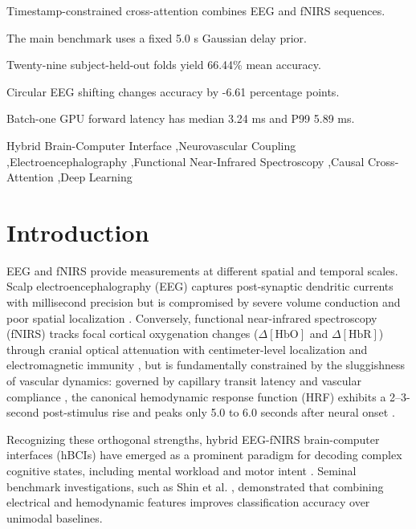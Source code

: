\documentclass[final,5p,times,twocolumn]{elsarticle}
\begin{document}
\begin{frontmatter}
\begin{highlights}
\item Timestamp-constrained cross-attention combines EEG and fNIRS sequences.
\item The main benchmark uses a fixed 5.0 s Gaussian delay prior.
\item Twenty-nine subject-held-out folds yield 66.44\% mean accuracy.
\item Circular EEG shifting changes accuracy by -6.61 percentage points.
\item Batch-one GPU forward latency has median 3.24 ms and P99 5.89 ms.
\end{highlights}

\begin{keyword}
Hybrid Brain-Computer Interface \sep Neurovascular Coupling \sep Electroencephalography \sep Functional Near-Infrared Spectroscopy \sep Causal Cross-Attention \sep Deep Learning
\end{keyword}

\end{frontmatter}

\section{Introduction}
\label{sec:intro}
EEG and fNIRS provide measurements at different spatial and temporal scales. Scalp electroencephalography (EEG) captures post-synaptic dendritic currents with millisecond precision but is compromised by severe volume conduction and poor spatial localization \cite{buzsaki2012origin}. Conversely, functional near-infrared spectroscopy (fNIRS) tracks focal cortical oxygenation changes ($\Delta[\text{HbO}]$ and $\Delta[\text{HbR}]$) through cranial optical attenuation with centimeter-level localization and electromagnetic immunity \cite{delpy1988estimation, scholkmann2014review}, but is fundamentally constrained by the sluggishness of vascular dynamics: governed by capillary transit latency and vascular compliance \cite{buxton1998dynamics, strangman2002non}, the canonical hemodynamic response function (HRF) exhibits a 2--3-second post-stimulus rise and peaks only 5.0 to 6.0 seconds after neural onset \cite{friston1998event, glover1999deconvolution, pinti2019present}.

Recognizing these orthogonal strengths, hybrid EEG-fNIRS brain-computer interfaces (hBCIs) have emerged as a prominent paradigm for decoding complex cognitive states, including mental workload and motor intent \cite{hong2017future, fazli2012enhanced, buccino2016hybrid, yin2015review}. Seminal benchmark investigations, such as Shin et al. \cite{shin2017open}, demonstrated that combining electrical and hemodynamic features improves classification accuracy over unimodal baselines.
\end{document}
